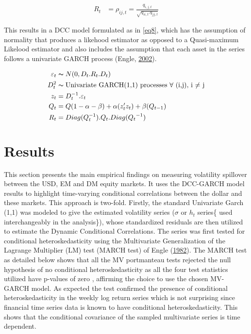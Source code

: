 \documentclass[11pt,preprint, authoryear]{elsarticle}
\numberwithin{equation}{section}
\numberwithin{figure}{section}
\numberwithin{table}{section}
\begin{document}
\begin{align} \label{eq7}
R_t &= \rho_{ij,t} = \frac{q_{i,j,t}}{\sqrt{q_{ii,t}.q_{jj,t}}} 
\end{align}

This results in a DCC model formulated as in \ref{eq8}, which has the
assumption of normality that produces a likehood estimator as opposed to
a Quasi-maximum Likelood estimator and also includes the assumption that
each asset in the series follows a univariate GARCH process (Engle,
\protect\hyperlink{ref-engle2002}{2002}).

\begin{align} \label{eq8}
\varepsilon_t &\thicksim  N(0,D_t.R_t.D_t) \notag \\
D_t^2 &\thicksim \text{Univariate GARCH(1,1) processes $\forall$ (i,j), i $\ne$ j} \notag \\
z_t&=D_t^{-1}.\varepsilon_t \notag \\
Q_t&={Q}(1-\alpha-\beta)+\alpha(z_t'z_t)+\beta(Q_{t-1}) \notag \\
R_t &= Diag(Q_t^{-1}).Q_t.Diag({Q_t}^{-1}) \notag \\
\end{align}

\hypertarget{results}{%
\section{Results}\label{results}}

This section presents the main empirical findings on measuring
volatility spillover between the USD, EM and DM equity markets. It uses
the DCC-GARCH model results to highlight time-varying conditional
correlations between the dollar and these markets. This approach is
two-fold. Firstly, the standard Univariate Garch (1,1) was modeled to
give the estimated volatility series (\(\sigma\) or \(h_t\) series\{
used interchangeably in the analysis\}), whose standardized residuals
are then utilized to estimate the Dynamic Conditional Correlations. The
series was first tested for conditional heteroskedasticity using the
Multivariate Generalization of the Lagrange Multiplier (LM) test (MARCH
test) of Engle (\protect\hyperlink{ref-engle1982}{1982}). The MARCH test
as detailed below shows that all the MV portmanteau tests rejected the
null hypothesis of no conditional heteroskedasticity as all the four
test statistics utilized have p-values of zero , affirming the choice to
use the chosen MV-GARCH model. As expected the test confirmed the
presence of conditional heteroskedasticity in the weekly log return
series which is not surprising since financial time series data is known
to have conditional heteroskedasticity. This shows that the conditional
covariance of the sampled multivariate series is time dependent.
\end{document}

